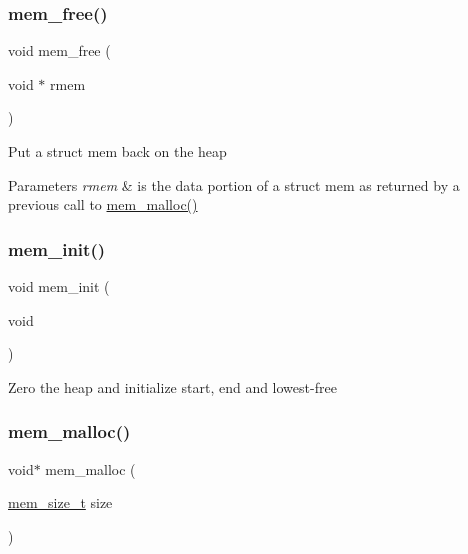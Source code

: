 \subsubsection{\texorpdfstring{mem\+\_\+free()}{mem\_free()}}
{\footnotesize\ttfamily void mem\+\_\+free (\begin{DoxyParamCaption}\item[{void $\ast$}]{rmem }\end{DoxyParamCaption})}

Put a struct mem back on the heap


\begin{DoxyParams}{Parameters}
{\em rmem} & is the data portion of a struct mem as returned by a previous call to \hyperlink{native_2lwip_2src_2core_2mem_8c_a932aa40d85b14cb7331625e012d12335}{mem\+\_\+malloc()} \\
\hline
\end{DoxyParams}
\mbox{\label{openmote-cc2538_2lwip_2src_2core_2mem_8c_a44a136e3b70c36abb6f8dc060c778113}} 
\subsubsection{\texorpdfstring{mem\+\_\+init()}{mem\_init()}}
{\footnotesize\ttfamily void mem\+\_\+init (\begin{DoxyParamCaption}\item[{void}]{ }\end{DoxyParamCaption})}

Zero the heap and initialize start, end and lowest-\/free \mbox{\label{openmote-cc2538_2lwip_2src_2core_2mem_8c_a932aa40d85b14cb7331625e012d12335}} 
\subsubsection{\texorpdfstring{mem\+\_\+malloc()}{mem\_malloc()}}
{\footnotesize\ttfamily void$\ast$ mem\+\_\+malloc (\begin{DoxyParamCaption}\item[{\hyperlink{native_2lwip_2src_2include_2lwip_2mem_8h_a49bff6e5dd4cb95fe6dc0670962bbf54}{mem\+\_\+size\+\_\+t}}]{size }\end{DoxyParamCaption})}

